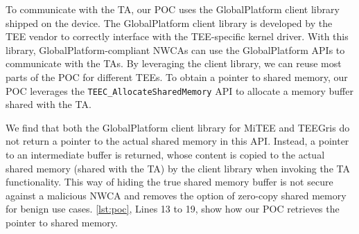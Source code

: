 \documentclass[conference]{IEEEtran}
\newcommand{\mitee}{MiTEE\xspace}
\newcommand{\teegris}{TEEGris\xspace}
\begin{document}
To communicate with the TA, our POC uses the GlobalPlatform client library shipped on the device. 
The GlobalPlatform client library is developed by the TEE vendor to correctly interface with 
the TEE-specific kernel driver. With this library, GlobalPlatform-compliant 
NWCAs can use the GlobalPlatform APIs to communicate with the TAs. By leveraging the client library, we can reuse most
parts of the POC for different TEEs. To obtain a pointer to shared memory, our POC 
leverages the \texttt{TEEC\_AllocateSharedMemory} API to allocate a memory buffer 
shared with the TA. 

We find that both the GlobalPlatform client library for \mitee 
and \teegris do not return a pointer to the actual shared memory in this API. 
Instead, a pointer to an intermediate buffer is returned, whose content is copied 
to the actual shared memory (shared with the TA) by the client library when invoking the TA 
functionality. This way of hiding the true shared memory buffer is not secure against a malicious 
NWCA and removes the option of zero-copy shared memory for benign use cases. 
\autoref{lst:poc}, Lines 13 to 19, show how our POC retrieves the pointer to shared memory.



\end{document}
